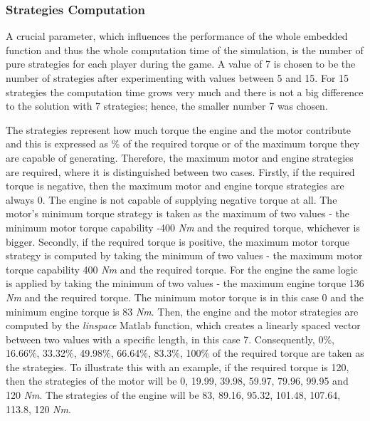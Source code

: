 \subsubsection{Strategies Computation}
A crucial parameter, which influences the performance of the whole embedded function and thus the whole computation time of the simulation, is the number of pure strategies for each player during the game. A value of 7 is chosen to be the number of strategies after experimenting with values between 5 and 15. For 15 strategies the computation time grows very much and there is not a big difference to the solution with 7 strategies; hence, the smaller number 7 was chosen.

The strategies represent how much torque the engine and the motor contribute and this is expressed as \% of the required torque or of the maximum torque they are capable of generating. Therefore, the maximum motor and engine strategies are required, where it is distinguished between two cases. Firstly, if the required torque is negative, then the maximum motor and engine torque strategies are always 0. The engine is not capable of supplying negative torque at all. The motor's minimum torque strategy is taken as the maximum of two values - the minimum motor torque capability -400 \textit{Nm} and the required torque, whichever is bigger. Secondly, if the required torque is positive, the maximum motor torque strategy is computed by taking the minimum of two values - the maximum motor torque capability 400 \textit{Nm} and the required torque. For the engine the same logic is applied by taking the minimum of two values - the maximum engine torque 136 \textit{Nm} and the required torque. The minimum motor torque is in this case 0 and the minimum engine torque is 83 \textit{Nm}. Then, the engine and the motor strategies are computed by the \textit{linspace} Matlab function, which creates a linearly spaced vector between two values with a specific length, in this case 7. Consequently, 0\%, 16.66\%, 33.32\%, 49.98\%, 66.64\%, 83.3\%, 100\% of the required torque are taken as the strategies. To illustrate this with an example, if the required torque is 120, then the strategies of the motor will be 0, 19.99, 39.98, 59.97, 79.96, 99.95 and 120 \textit{Nm}. The strategies of the engine will be 83, 89.16, 95.32, 101.48, 107.64, 113.8, 120 \textit{Nm}. 

